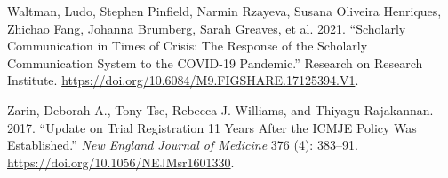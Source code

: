 \documentclass[
]{article}
\newlength{\cslhangindent}
\newenvironment{cslreferences}%
  {\setlength{\parindent}{0pt}%
  \everypar{\setlength{\hangindent}{\cslhangindent}}\ignorespaces}%
  {\par}
\begin{document}
\begin{cslreferences}
\leavevmode\hypertarget{ref-waltman_ludo_scholarly_2021}{}%
Waltman, Ludo, Stephen Pinfield, Narmin Rzayeva, Susana Oliveira
Henriques, Zhichao Fang, Johanna Brumberg, Sarah Greaves, et al. 2021.
``Scholarly Communication in Times of Crisis: The Response of the
Scholarly Communication System to the COVID-19 Pandemic.'' Research on
Research Institute.
\url{https://doi.org/10.6084/M9.FIGSHARE.17125394.V1}.

\leavevmode\hypertarget{ref-zarin_update_2017}{}%
Zarin, Deborah A., Tony Tse, Rebecca J. Williams, and Thiyagu
Rajakannan. 2017. ``Update on Trial Registration 11 Years After the
ICMJE Policy Was Established.'' \emph{New England Journal of Medicine}
376 (4): 383--91. \url{https://doi.org/10.1056/NEJMsr1601330}.
\end{cslreferences}
\end{document}
